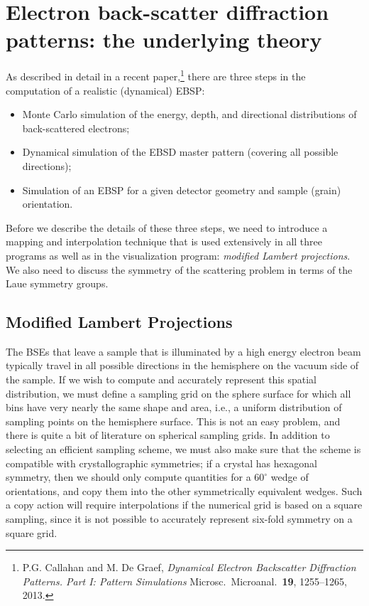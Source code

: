 \documentclass[DIV=calc, paper=letter, fontsize=11pt]{scrartcl}	 %
\begin{document}
\section{Electron back-scatter diffraction patterns: the underlying theory\label{sec:theory}}
As described in detail in a recent paper,\footnote{P.G. Callahan and M. De Graef, \textit{Dynamical Electron Backscatter Diffraction Patterns. Part I: Pattern Simulations}
Microsc.\ Microanal.\ \textbf{19}, 1255--1265, 2013.} there are three steps in the computation of a realistic (dynamical) EBSP:
\begin{itemize}
	\item Monte Carlo simulation of the energy, depth, and directional distributions of back-scattered electrons;
	\item Dynamical simulation of the EBSD master pattern (covering all possible directions);
	\item Simulation of an EBSP for a given detector geometry and sample (grain) orientation.
\end{itemize}

Before we describe the details of these three steps, we need to introduce a mapping and interpolation technique that is used extensively in all
three programs as well as in the visualization program: \textit{modified Lambert projections}.  We also need to discuss the 
symmetry of the scattering problem in terms of the Laue symmetry groups. 

\subsection{Modified Lambert Projections \label{sec:Lambert}}
The BSEs that leave a sample that is illuminated by a high energy electron beam typically travel in all possible directions in the hemisphere
on the vacuum side of the sample.  If we wish to compute and accurately represent this spatial distribution, we must define a sampling grid 
on the sphere surface for which all bins have very nearly the same shape and area, i.e., a uniform distribution of sampling points 
on the hemisphere surface.  This is not an easy problem, and there is quite a bit of literature on spherical sampling grids.  In addition 
to selecting an efficient sampling scheme, we must also make sure that the scheme is compatible with crystallographic symmetries; if a crystal
has hexagonal symmetry, then we should only compute quantities for a $60^{\circ}$ wedge of orientations, and copy them into the other symmetrically
equivalent wedges.  Such a copy action will require interpolations if the numerical grid is based on a square sampling, since it is not possible
to accurately represent six-fold symmetry on a square grid.  
\end{document}
